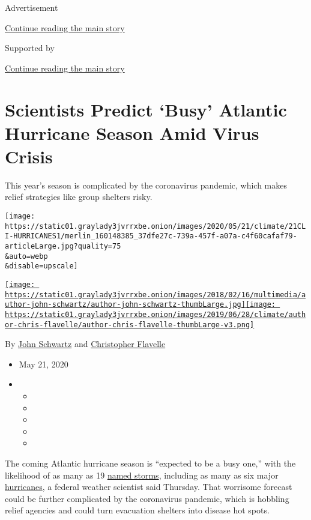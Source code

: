 Advertisement

\protect\hyperlink{after-top}{Continue reading the main story}

Supported by

\protect\hyperlink{after-sponsor}{Continue reading the main story}

\hypertarget{scientists-predict-busy-atlantic-hurricane-season-amid-virus-crisis}{%
\section{Scientists Predict `Busy' Atlantic Hurricane Season Amid Virus
Crisis}\label{scientists-predict-busy-atlantic-hurricane-season-amid-virus-crisis}}

This year's season is complicated by the coronavirus pandemic, which
makes relief strategies like group shelters risky.

\texttt{[image: https://static01.graylady3jvrrxbe.onion/images/2020/05/21/climate/21CLI-HURRICANES1/merlin\_160148385\_37dfe27c-739a-457f-a07a-c4f60cafaf79-articleLarge.jpg?quality=75\\\&auto=webp\\\&disable=upscale]}

\href{https://www.nytimes3xbfgragh.onion/by/john-schwartz}{\texttt{[image: https://static01.graylady3jvrrxbe.onion/images/2018/02/16/multimedia/author-john-schwartz/author-john-schwartz-thumbLarge.jpg]}}\href{https://www.nytimes3xbfgragh.onion/by/christopher-flavelle}{\texttt{[image: https://static01.graylady3jvrrxbe.onion/images/2019/06/28/climate/author-chris-flavelle/author-chris-flavelle-thumbLarge-v3.png]}}

By \href{https://www.nytimes3xbfgragh.onion/by/john-schwartz}{John
Schwartz} and
\href{https://www.nytimes3xbfgragh.onion/by/christopher-flavelle}{Christopher
Flavelle}

\begin{itemize}
\item
  May 21, 2020
\item
  \begin{itemize}
  \item
  \item
  \item
  \item
  \item
  \end{itemize}
\end{itemize}

The coming Atlantic hurricane season is ``expected to be a busy one,''
with the likelihood of as many as 19
\href{https://www.nytimes3xbfgragh.onion/2020/06/05/us/tropical-storm-cristobal-louisiana.html}{named
storms}, including as many as six major
\href{https://www.nytimes3xbfgragh.onion/interactive/2020/07/25/us/hurricane-hanna-tracker-map.html}{hurricanes},
a federal weather scientist said Thursday. That worrisome forecast could
be further complicated by the coronavirus pandemic, which is hobbling
relief agencies and could turn evacuation shelters into disease hot
spots.

